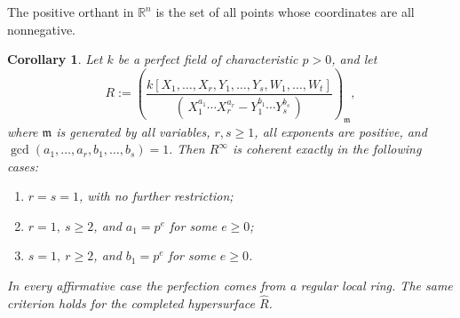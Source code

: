 \documentclass[11pt,a4paper]{amsart}
\numberwithin{equation}{section}
\newtheorem{corollary}[theorem]{Corollary}
\begin{document}
The {positive orthant} in \(\mathbb{R}^n\) is the set of all points whose coordinates are all nonnegative.

 
 \begin{corollary}\label{thm:hypersurface}
Let $k$ be a perfect field of characteristic $p>0$, and let	$$	R:=
 	\left(
 	\frac{k[X_1,\ldots,X_r,Y_1,\ldots,Y_s,W_1,\ldots,W_t]}
 	{(\,X_1^{a_1}\cdots X_r^{a_r}
 		-Y_1^{b_1}\cdots Y_s^{b_s}\,)}
 	\right)_{\mathfrak m},$$
 where $\mathfrak m$ is generated by all variables,
 $r,s\geq1$, all exponents are positive, and	$\gcd(a_1,\ldots,a_r,b_1,\ldots,b_s)=1.$
 Then $R^\infty$ is coherent exactly in the following cases:
 \begin{enumerate}
 \item $r=s=1$, with no further restriction;
\item $r=1,\ s\geq2$, and $a_1=p^e$ for some $e\geq0$;
\item $s=1,\ r\geq2$, and $b_1=p^e$ for some $e\geq0$.
 	\end{enumerate}
 In every affirmative case the perfection comes from a regular local
 ring. The same criterion holds for the completed hypersurface
 $\widehat R$.
 \end{corollary}
 
\end{document}
